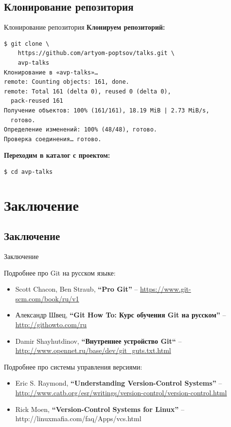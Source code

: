 \documentclass[presentation]{beamer}
\begin{document}


\subsection{Клонирование репозитория}

\begin{frame}[fragile]{Клонирование репозитория}
  \textbf{Клонируем репозиторий:}
  \small
\begin{verbatim}
$ git clone \
    https://github.com/artyom-poptsov/talks.git \
    avp-talks
Клонирование в «avp-talks»…
remote: Counting objects: 161, done.
remote: Total 161 (delta 0), reused 0 (delta 0),
  pack-reused 161
Получение объектов: 100% (161/161), 18.19 MiB | 2.73 MiB/s,
  готово.
Определение изменений: 100% (48/48), готово.
Проверка соединения… готово.
\end{verbatim}
  \normalsize
  \textbf{Переходим в каталог с проектом:}
  \small
\begin{verbatim}
$ cd avp-talks
\end{verbatim}
\end{frame}



\section{Заключение}

\subsection{Заключение}

\begin{frame}{Заключение}

  Подробнее про Git на русском языке:
  \begin{itemize}
  \item Scott Chacon, Ben Straub, \textbf{``Pro Git''} --
    \url{https://www.git-scm.com/book/ru/v1}
  \item Александр Швец, \textbf{``Git How To: Курс обучения Git на
    русском''} -- \url{http://githowto.com/ru}
  \item Damir Shayhutdinov, \textbf{``Внутреннее устройство Git``} --
    \url{http://www.opennet.ru/base/dev/git\_guts.txt.html}
  \end{itemize}

  \bigskip

  Подробнее про системы управления версиями:
  \begin{itemize}
  \item Eric S. Raymond, \textbf{``Understanding Version-Control
    Systems''} --
    \url{http://www.catb.org/esr/writings/version-control/version-control.html}
  \item Rick Moen, \textbf{``Version-Control Systems for Linux''} --
    http://linuxmafia.com/faq/Apps/vcs.html
  \end{itemize}

\end{frame}
\end{document}
